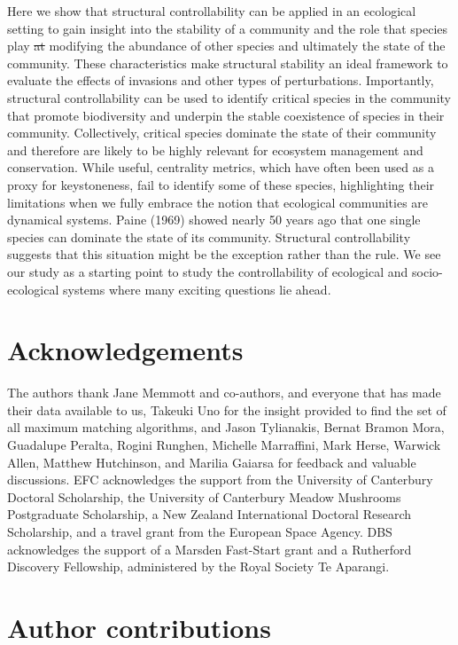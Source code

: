 \documentclass[a4paper]{artikel1}
\theoremstyle{definition}
\theoremstyle{definition}
\theoremstyle{definition}
\theoremstyle{remark}
\providecommand{\DIFaddtex}[1]{{\protect\color{blue}\uwave{#1}}} %
\providecommand{\DIFdeltex}[1]{{\protect\color{red}\sout{#1}}}                      %
\providecommand{\DIFaddbegin}{} %
\providecommand{\DIFaddend}{} %
\providecommand{\DIFdelbegin}{} %
\providecommand{\DIFdelend}{} %
\providecommand{\DIFadd}[1]{\texorpdfstring{\DIFaddtex{#1}}{#1}} %
\providecommand{\DIFdel}[1]{\texorpdfstring{\DIFdeltex{#1}}{}} %
\begin{document}
Here we show that structural controllability can be applied in an
ecological setting to gain insight into the stability of a community and
the role that species play \DIFdelbegin \DIFdel{at }\DIFdelend \DIFaddbegin \DIFadd{in }\DIFaddend modifying the abundance of other species
and ultimately the state of the community. These characteristics make
structural stability an ideal framework to evaluate the effects of
invasions and other types of perturbations. Importantly, structural
controllability can be used to identify critical species in the
community that promote biodiversity and underpin the stable coexistence
of species in their community. Collectively, critical species dominate
the state of their community and therefore are likely to be highly
relevant for ecosystem management and conservation. While useful,
centrality metrics, which have often been used as a proxy for
keystoneness, fail to identify some of these species, highlighting their
limitations when we fully embrace the notion that ecological communities
are dynamical systems. Paine (1969) showed nearly 50 years ago that one
single species can dominate the state of its community. Structural
controllability suggests that this situation might be the exception
rather than the rule. We see our study as a starting point to study the
controllability of ecological and socio-ecological systems where many
exciting questions lie ahead.

\section{Acknowledgements}\label{acknowledgements}

The authors thank Jane Memmott and co-authors, and everyone that has
made their data available to us, Takeuki Uno for the insight provided to
find the set of all maximum matching algorithms, and Jason Tylianakis,
Bernat Bramon Mora, Guadalupe Peralta, Rogini Runghen, Michelle
Marraffini, Mark Herse, Warwick Allen, Matthew Hutchinson, and Marilia
Gaiarsa for feedback and valuable discussions. EFC acknowledges the
support from the University of Canterbury Doctoral Scholarship, the
University of Canterbury Meadow Mushrooms Postgraduate Scholarship, a
New Zealand International Doctoral Research Scholarship, and a travel
grant from the European Space Agency. DBS acknowledges the support of a
Marsden Fast-Start grant and a Rutherford Discovery Fellowship,
administered by the Royal Society Te Aparangi.

\section{Author contributions}\label{author-contributions}
\end{document}
